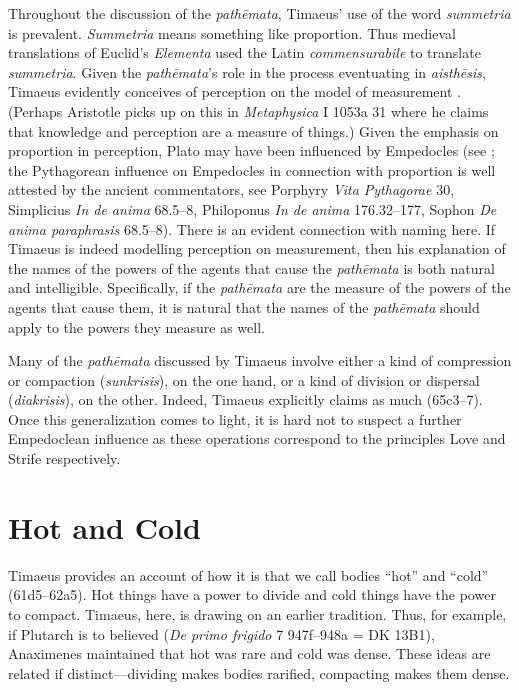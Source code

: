 Throughout the discussion of the \emph{pathēmata}, Timaeus' use of the word \emph{summetria} is prevalent. \emph{Summetria} means something like proportion. Thus medieval translations of Euclid's \emph{Elementa} used the Latin \emph{commensurabile} to translate \emph{summetria}. Given the \emph{pathēmata}'s role in the process eventuating in \emph{aisthēsis}, Timaeus evidently conceives of perception on the model of measurement \citep[155--6]{Brisson:1997qr}. (Perhaps Aristotle picks up on this in \emph{Metaphysica} I 1053a 31 where he claims that knowledge and perception are a measure of things.) Given the emphasis on proportion in perception, Plato may have been influenced by Empedocles (see \citealt{Ierodiakonou:2005fk,Ierodiakonou:2005ly}; the Pythagorean influence on Empedocles in connection with proportion is well attested by the ancient commentators, see Porphyry \emph{Vita Pythagorae} 30, Simplicius \emph{In de anima} 68.5--8, Philoponus \emph{In de anima} 176.32--177, Sophon \emph{De anima paraphrasis} 68.5--8). There is an evident connection with naming here. If Timaeus is indeed modelling perception on measurement, then his explanation of the names of the powers of the agents that cause the \emph{pathēmata} is both natural and intelligible. Specifically, if the \emph{pathēmata} are the measure of the powers of the agents that cause them, it is natural that the names of the \emph{pathēmata} should apply to the powers they measure as well. 

Many of the \emph{pathēmata} discussed by Timaeus involve either a kind of compression or compaction (\emph{sunkrisis}), on the one hand, or a kind of  division or dispersal (\emph{diakrisis}), on the other. Indeed, Timaeus explicitly claims as much (65c3--7). Once this generalization comes to light, it is hard not to suspect a further Empedoclean influence as these operations correspond to the principles Love and Strife respectively.


\section{Hot and Cold} %
\label{sec:hot_and_cold}

Timaeus provides an account of how it is that we call bodies ``hot'' and ``cold'' (61d5--62a5). Hot things have a power to divide and cold things have the power to compact. Timaeus, here, is drawing on an earlier tradition. Thus, for example, if Plutarch is to believed (\emph{De primo frigido} 7 947f--948a = DK 13B1), Anaximenes maintained that hot was rare and cold was dense. These ideas are related if distinct---dividing makes bodies rarified, compacting makes them dense.

